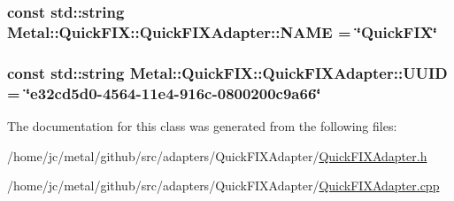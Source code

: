\subsubsection[{N\+A\+M\+E}]{\setlength{\rightskip}{0pt plus 5cm}const std\+::string Metal\+::\+Quick\+F\+I\+X\+::\+Quick\+F\+I\+X\+Adapter\+::\+N\+A\+M\+E = \char`\"{}Quick\+F\+I\+X\char`\"{}\hspace{0.3cm}{\ttfamily [static]}}\label{classMetal_1_1QuickFIX_1_1QuickFIXAdapter_aad5f72f920f26469fa0192dcbdb3a59a}
\hypertarget{classMetal_1_1QuickFIX_1_1QuickFIXAdapter_aa8a9ed777bdbc2c9a138fa35741da77a}{}
\subsubsection[{U\+U\+I\+D}]{\setlength{\rightskip}{0pt plus 5cm}const std\+::string Metal\+::\+Quick\+F\+I\+X\+::\+Quick\+F\+I\+X\+Adapter\+::\+U\+U\+I\+D = \char`\"{}e32cd5d0-\/4564-\/11e4-\/916c-\/0800200c9a66\char`\"{}\hspace{0.3cm}{\ttfamily [static]}}\label{classMetal_1_1QuickFIX_1_1QuickFIXAdapter_aa8a9ed777bdbc2c9a138fa35741da77a}


The documentation for this class was generated from the following files\+:\begin{DoxyCompactItemize}
\item 
/home/jc/metal/github/src/adapters/\+Quick\+F\+I\+X\+Adapter/\hyperlink{QuickFIXAdapter_8h}{Quick\+F\+I\+X\+Adapter.\+h}\item 
/home/jc/metal/github/src/adapters/\+Quick\+F\+I\+X\+Adapter/\hyperlink{QuickFIXAdapter_8cpp}{Quick\+F\+I\+X\+Adapter.\+cpp}\end{DoxyCompactItemize}
